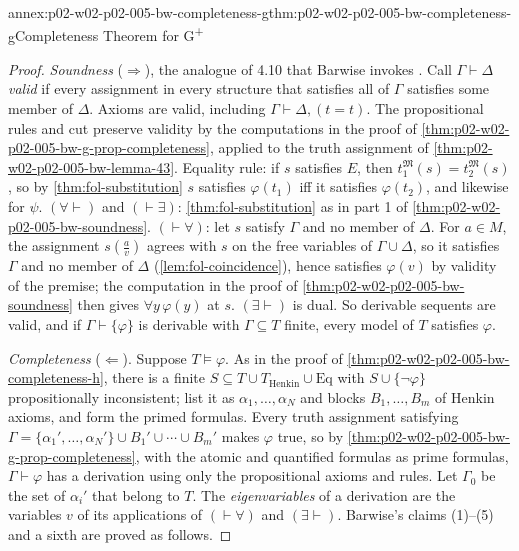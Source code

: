 \begin{annexitem}{annex:p02-w02-p02-005-bw-completeness-g}{thm:p02-w02-p02-005-bw-completeness-g}{Completeness Theorem for G\textsuperscript{+}}
\begin{proof}
\emph{Soundness} (\(\Rightarrow\)), the analogue of 4.10 that Barwise
invokes \cite[ch.~A.1, \S4, p.~39]{Barwise1977FirstOrder}.  Call
\(\Gamma\vdash\Delta\) \emph{valid} if every assignment in every structure
that satisfies all of \(\Gamma\) satisfies some member of \(\Delta\).
Axioms are valid, including \(\Gamma\vdash\Delta,(t=t)\).  The
propositional rules and cut preserve validity by the computations in the
proof of \cref{thm:p02-w02-p02-005-bw-g-prop-completeness}, applied to the
truth assignment of \cref{thm:p02-w02-p02-005-bw-lemma-43}.  Equality rule:
if \(s\) satisfies \(E\), then \(t_1^{\mathfrak M}(s)=t_2^{\mathfrak M}(s)\),
so by \cref{thm:fol-substitution} \(s\) satisfies \(\varphi(t_1)\) iff it
satisfies \(\varphi(t_2)\), and likewise for \(\psi\).  \((\forall\vdash)\)
and \((\vdash\exists)\): \cref{thm:fol-substitution} as in part 1 of
\cref{thm:p02-w02-p02-005-bw-soundness}.  \((\vdash\forall)\): let \(s\)
satisfy \(\Gamma\) and no member of \(\Delta\).  For \(a\in M\), the
assignment \(s(\tfrac av)\) agrees with \(s\) on the free variables of
\(\Gamma\cup\Delta\), so it satisfies \(\Gamma\) and no member of \(\Delta\)
(\cref{lem:fol-coincidence}), hence satisfies \(\varphi(v)\) by validity of
the premise; the computation in the proof of
\cref{thm:p02-w02-p02-005-bw-soundness} then gives \(\forall y\,\varphi(y)\)
at \(s\).  \((\exists\vdash)\) is dual.  So derivable sequents are valid,
and if \(\Gamma\vdash\{\varphi\}\) is derivable with \(\Gamma\subseteq T\)
finite, every model of \(T\) satisfies \(\varphi\).

\emph{Completeness} (\(\Leftarrow\)).  Suppose \(T\models\varphi\).  As in
the proof of \cref{thm:p02-w02-p02-005-bw-completeness-h}, there is a finite
\(S\subseteq T\cup T_{\mathrm{Henkin}}\cup\mathrm{Eq}\) with
\(S\cup\{\neg\varphi\}\) propositionally inconsistent; list it as
\(\alpha_1,\ldots,\alpha_N\) and blocks \(B_1,\ldots,B_m\) of Henkin axioms,
and form the primed formulas.  Every truth assignment satisfying
\(\Gamma=\{\alpha_1',\ldots,\alpha_N'\}\cup B_1'\cup\cdots\cup B_m'\) makes
\(\varphi\) true, so by \cref{thm:p02-w02-p02-005-bw-g-prop-completeness},
with the atomic and quantified formulas as prime formulas,
\(\Gamma\vdash\varphi\) has a derivation using only the propositional
axioms and rules.  Let \(\Gamma_0\) be the set of \(\alpha_i'\) that belong
to \(T\).  The \emph{eigenvariables} of a derivation are the variables
\(v\) of its applications of \((\vdash\forall)\) and \((\exists\vdash)\).
Barwise's claims (1)--(5) \cite[ch.~A.1, \S4, pp.~39--40]{Barwise1977FirstOrder}
and a sixth are proved as follows.


\end{proof}
\end{annexitem}
